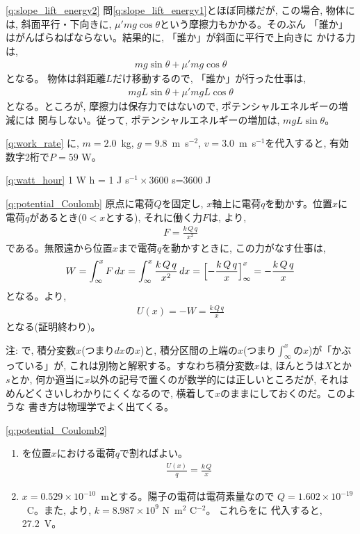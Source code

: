 % 
\ref{q:slope_lift_energy2}
問\ref{q:slope_lift_energy1}とほぼ同様だが, この場合, 物体には, 
斜面平行・下向きに, $\mu'mg\cos\theta$という摩擦力もかかる。そのぶん
「誰か」はがんばらねばならない。結果的に, 「誰か」が斜面に平行で上向きに
かける力は, 
\begin{eqnarray}mg\sin\theta+\mu'mg\cos\theta\end{eqnarray}
となる。
物体は斜距離$L$だけ移動するので, 「誰か」が行った仕事は, 
\begin{eqnarray}mgL\sin\theta+\mu'mgL\cos\theta\end{eqnarray}
となる。ところが, 摩擦力は保存力ではないので, ポテンシャルエネルギーの増減には
関与しない。従って, ポテンシャルエネルギーの増加は, $mgL\sin\theta$。\mv

\ref{q:work_rate}
に, $m=2.0$~kg, $g=9.8$~m~s$^{-2}$, $v=3.0$~m~s$^{-1}$を代入すると, 
有効数字2桁で$P= 59$ W。
\mv

%
\ref{q:watt_hour}
1 W h = 1 J s$^{-1} \times 3600$ s=3600 J
\mv


\ref{q:potential_Coulomb}
原点に電荷$Q$を固定し, $x$軸上に電荷$q$を動かす。位置$x$に電荷$q$があるとき($0<x$とする), 
それに働く力$F$は, より, 
\begin{eqnarray}
F=\frac{k\,Q\,q}{x^2}
\end{eqnarray}
である。無限遠から位置$x$まで電荷$q$を動かすときに, この力がなす仕事は, 
\begin{eqnarray}
W=\int_{\infty}^{x}F\,dx=\int_{\infty}^{x}\frac{k\,Q\,q}{x^2}\,dx
=\Bigl[-\frac{k\,Q\,q}{x}\Bigr]_{\infty}^{x}=-\frac{k\,Q\,q}{x}\nonumber\\\label{eq:potential_Coulomb00}
\end{eqnarray}
となる。より, 
\begin{eqnarray}
U(x)=-W=\frac{k\,Q\,q}{x}
\end{eqnarray}
となる(証明終わり)。\mv

{\small 注: で, 積分変数$x$(つまり$dx$の$x$)と, 
積分区間の上端の$x$(つまり$\int_{\infty}^x$の$x$)が「かぶっている」が, 
これは別物と解釈する。すなわち積分変数$x$は, ほんとうは$X$とか$s$とか, 
何か適当に$x$以外の記号で置くのが数学的には正しいところだが, それは
めんどくさいしわかりにくくなるので, 横着して$x$のままにしておくのだ。このような
書き方は物理学でよく出てくる。\mv}

\ref{q:potential_Coulomb2}　
\begin{enumerate}
\item {}を位置$x$における電荷$q$で割ればよい。
\begin{eqnarray}
\frac{U(x)}{q}=\frac{k\,Q}{x}\label{eq:voltage_Coulomb}
\end{eqnarray}
\item $x=0.529\times10^{-10}$~mとする。陽子の電荷は電荷素量なので
$Q=1.602\times10^{-19}$~C。また, より, 
$k=8.987\times 10^{9}$ N~m$^2$ C$^{-2}$。
これらをに
代入すると, 27.2~V。
\end{enumerate}

